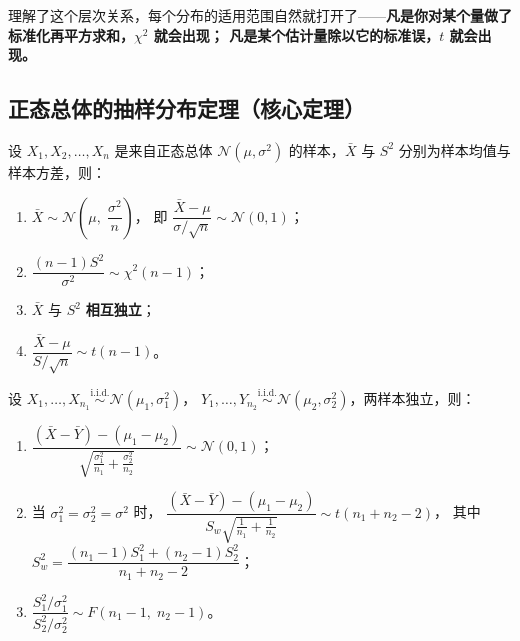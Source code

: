 理解了这个层次关系，每个分布的适用范围自然就打开了——\textbf{凡是你对某个量做了标准化再平方求和，$\chi^2$ 就会出现；
凡是某个估计量除以它的标准误，$t$ 就会出现。}

\subsection{正态总体的抽样分布定理（核心定理）}

\begin{theorem}[单个正态总体]
设 $X_1, X_2, \dots, X_n$ 是来自正态总体 $\mathcal{N}(\mu, \sigma^2)$ 的样本，$\bar{X}$ 与 $S^2$ 分别为样本均值与样本方差，则：
\begin{enumerate}[label=(\arabic*)]
    \item $\bar{X} \sim \mathcal{N}\!\left(\mu,\; \dfrac{\sigma^2}{n}\right)$，
          即 $\dfrac{\bar{X} - \mu}{\sigma / \sqrt{n}} \sim \mathcal{N}(0,1)$；
    \item $\dfrac{(n-1)S^2}{\sigma^2} \sim \chi^2(n-1)$；
    \item $\bar{X}$ 与 $S^2$ \textbf{相互独立}；
    \item $\dfrac{\bar{X} - \mu}{S / \sqrt{n}} \sim t(n-1)$。
\end{enumerate}
\end{theorem}

\begin{theorem}[两个正态总体]
设 $X_1,\dots,X_{n_1} \stackrel{\mathrm{i.i.d.}}{\sim} \mathcal{N}(\mu_1, \sigma_1^2)$，
$Y_1,\dots,Y_{n_2} \stackrel{\mathrm{i.i.d.}}{\sim} \mathcal{N}(\mu_2, \sigma_2^2)$，两样本独立，则：
\begin{enumerate}[label=(\arabic*)]
    \item $\dfrac{(\bar{X} - \bar{Y}) - (\mu_1 - \mu_2)}{\sqrt{\frac{\sigma_1^2}{n_1} + \frac{\sigma_2^2}{n_2}}} \sim \mathcal{N}(0,1)$；
    \item 当 $\sigma_1^2 = \sigma_2^2 = \sigma^2$ 时，
          $\dfrac{(\bar{X} - \bar{Y}) - (\mu_1 - \mu_2)}{S_w \sqrt{\frac{1}{n_1} + \frac{1}{n_2}}} \sim t(n_1+n_2-2)$，
          其中 $S_w^2 = \dfrac{(n_1-1)S_1^2 + (n_2-1)S_2^2}{n_1+n_2-2}$；
    \item $\dfrac{S_1^2 / \sigma_1^2}{S_2^2 / \sigma_2^2} \sim F(n_1-1,\; n_2-1)$。
\end{enumerate}
\end{theorem}

